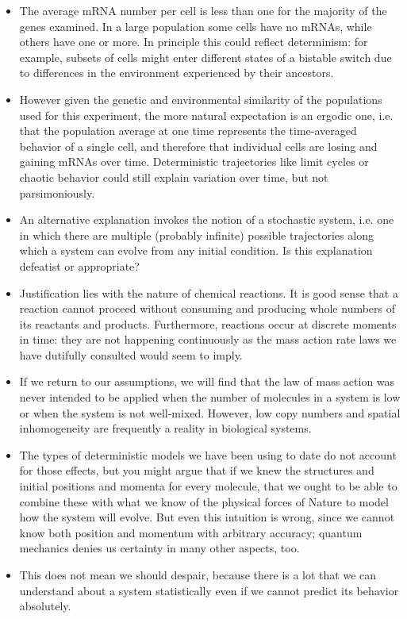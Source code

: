 \documentclass{article}
\begin{document}
\begin{itemize}
\item The average mRNA number per cell is less than one for the majority of the genes examined. In a large population some cells have no mRNAs, while others have one or more. In principle this could reflect determinism: for example, subsets of cells might enter different states of a bistable switch due to differences in the environment experienced by their ancestors. 
\item However given the genetic and environmental similarity of the populations used for this experiment, the more natural expectation is an ergodic one, i.e. that the population average at one time represents the time-averaged behavior of a single cell, and therefore that individual cells are losing and gaining mRNAs over time. Deterministic trajectories like limit cycles or chaotic behavior could still explain variation over time, but not parsimoniously.
\item An alternative explanation invokes the notion of a stochastic system, i.e. one in which there are multiple (probably infinite) possible trajectories along which a system can evolve from any initial condition. Is this explanation defeatist or appropriate?
\item Justification lies with the nature of chemical reactions. It is good sense that a reaction cannot proceed without consuming and producing whole numbers of its reactants and products. Furthermore, reactions occur at discrete moments in time: they are not happening continuously as the mass action rate laws we have dutifully consulted would seem to imply.
\item If we return to our assumptions, we will find that the law of mass action was never intended to be applied when the number of molecules in a system is low or when the system is not well-mixed. However, low copy numbers and spatial inhomogeneity are frequently a reality in biological systems.
\item The types of deterministic models we have been using to date do not account for those effects, but you might argue that if we knew the structures and initial positions and momenta for every molecule, that we ought to be able to combine these with what we know of the physical forces of Nature to model how the system will evolve. But even this intuition is wrong, since we cannot know both position and momentum with arbitrary accuracy; quantum mechanics denies us certainty in many other aspects, too.
\item This does not mean we should despair, because there is a lot that we can understand about a system statistically even if we cannot predict its behavior absolutely.
\end{itemize}
\end{document}
